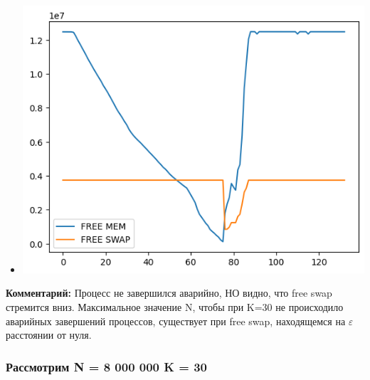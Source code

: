 \documentclass[10pt, a4paper]{article}
\begin{document}
\begin{itemize}
    \item \includegraphics[scale=0.8]{graphs/25.png}
\end{itemize}
\textbf{Комментарий: }
Процесс не завершился аварийно, НО видно, что free swap стремится вниз. Максимальное значение N, чтобы при K=30 не происходило аварийных завершений процессов, существует при free swap, находящемся на $\varepsilon$ расстоянии от нуля.

\subsubsection*{Рассмотрим \textbf{N = 8 000 000} \textbf{K = 30}}
\end{document}
